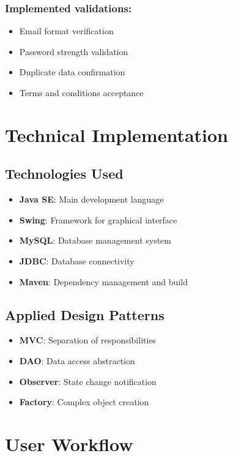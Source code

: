 \documentclass[conference]{IEEEtran}
\begin{document}
\subsubsection{Implemented validations:}
\begin{itemize}
    \item Email format verification
    \item Password strength validation
    \item Duplicate data confirmation
    \item Terms and conditions acceptance
\end{itemize}

\section{Technical Implementation}

\subsection{Technologies Used}
\begin{itemize}
    \item \textbf{Java SE}: Main development language
    \item \textbf{Swing}: Framework for graphical interface
    \item \textbf{MySQL}: Database management system
    \item \textbf{JDBC}: Database connectivity
    \item \textbf{Maven}: Dependency management and build
\end{itemize}

\subsection{Applied Design Patterns}
\begin{itemize}
    \item \textbf{MVC}: Separation of responsibilities
    \item \textbf{DAO}: Data access abstraction
    \item \textbf{Observer}: State change notification
    \item \textbf{Factory}: Complex object creation
\end{itemize}

\section{User Workflow}
\end{document}
